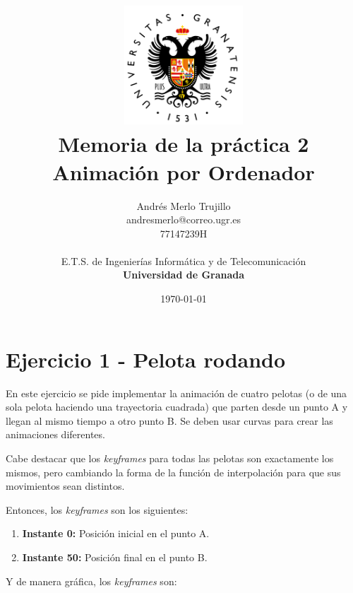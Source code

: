\documentclass{article}
\title{
\includegraphics[width=1.75in]{imagenes/UGR-Logo.png} \\
\vspace*{1in}
\textbf{Memoria de la práctica 2} \\
Animación por Ordenador \\
\vspace*{0.5in}}
\author{Andrés Merlo Trujillo \\
andresmerlo@correo.ugr.es \\
77147239H \\ 
\vspace*{0.5in} \\
E.T.S. de Ingenierías Informática y de Telecomunicación \\
\textbf{Universidad de Granada}} \date{\today}
\begin{document}
\begin{titlingpage}
    \maketitle
\end{titlingpage}

\tableofcontents

\newpage

\pagestyle{fancy}   %

\section{Ejercicio 1 - Pelota rodando}
En este ejercicio se pide implementar la animación de cuatro pelotas (o de una sola pelota haciendo una trayectoria cuadrada) que parten desde un punto A y llegan al mismo tiempo a otro punto B. Se deben usar curvas para crear las animaciones diferentes.

\bigskip

Cabe destacar que los \textit{keyframes} para todas las pelotas son exactamente los mismos, pero cambiando la forma de la función de interpolación para que sus movimientos sean distintos.

\bigskip

Entonces, los \textit{keyframes} son los siguientes:

\begin{enumerate}
    \item \textbf{Instante 0:} Posición inicial en el punto A.
    \item \textbf{Instante 50:} Posición final en el punto B.
\end{enumerate}

\bigskip

Y de manera gráfica, los \textit{keyframes} son:
\end{document}
